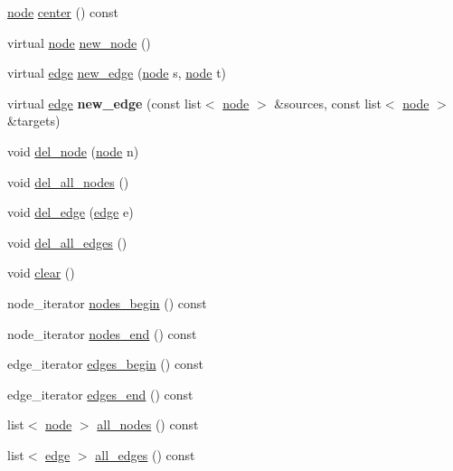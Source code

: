 \begin{DoxyCompactItemize}
\item 
\mbox{\hyperlink{classnode}{node}} \mbox{\hyperlink{classgraph_a351617e023b4b6833ab650a70fc086e7}{center}} () const
\item 
virtual \mbox{\hyperlink{classnode}{node}} \mbox{\hyperlink{classgraph_ab9505335c20558319b6cce25aed23524}{new\+\_\+node}} ()
\item 
virtual \mbox{\hyperlink{classedge}{edge}} \mbox{\hyperlink{classgraph_a02a0c3a219f75d68caa408ef339d4a1c}{new\+\_\+edge}} (\mbox{\hyperlink{classnode}{node}} s, \mbox{\hyperlink{classnode}{node}} t)
\item 
\mbox{\label{classgraph_aac84328e22e2c0e55a039e9b689bf574}} 
virtual \mbox{\hyperlink{classedge}{edge}} {\bfseries new\+\_\+edge} (const list$<$ \mbox{\hyperlink{classnode}{node}} $>$ \&sources, const list$<$ \mbox{\hyperlink{classnode}{node}} $>$ \&targets)
\item 
void \mbox{\hyperlink{classgraph_a8bdc09d5b9ac4bd26586b054d8fcbe91}{del\+\_\+node}} (\mbox{\hyperlink{classnode}{node}} n)
\item 
void \mbox{\hyperlink{classgraph_ad0ca1578643a51f96a76a846f14558df}{del\+\_\+all\+\_\+nodes}} ()
\item 
void \mbox{\hyperlink{classgraph_ad9356508c49c542dfd4b7169297387c6}{del\+\_\+edge}} (\mbox{\hyperlink{classedge}{edge}} e)
\item 
void \mbox{\hyperlink{classgraph_aae52be443c5aef001b5f6758855f15ad}{del\+\_\+all\+\_\+edges}} ()
\item 
void \mbox{\hyperlink{classgraph_a9ff5d6af3653e79f87b836701453f55a}{clear}} ()
\item 
node\+\_\+iterator \mbox{\hyperlink{classgraph_aec053a4b509d1be804237a80044c54c0}{nodes\+\_\+begin}} () const
\item 
node\+\_\+iterator \mbox{\hyperlink{classgraph_abbf9c0cb5629e98e1142254911238173}{nodes\+\_\+end}} () const
\item 
edge\+\_\+iterator \mbox{\hyperlink{classgraph_a7ba35a4c4e8343ffb27ed6d9703c6f18}{edges\+\_\+begin}} () const
\item 
edge\+\_\+iterator \mbox{\hyperlink{classgraph_aea8d7f976b85b6137f52d915e26639f6}{edges\+\_\+end}} () const
\item 
list$<$ \mbox{\hyperlink{classnode}{node}} $>$ \mbox{\hyperlink{classgraph_a13155130debfd891efcd132702016bde}{all\+\_\+nodes}} () const
\item 
list$<$ \mbox{\hyperlink{classedge}{edge}} $>$ \mbox{\hyperlink{classgraph_a8d2de5158a430ba21a85871a9657104b}{all\+\_\+edges}} () const

\end{DoxyCompactItemize}
